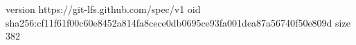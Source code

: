 version https://git-lfs.github.com/spec/v1
oid sha256:cf11f61f00c60e8452a814fa8cece0db0695ce93fa001dea87a56740f50e809d
size 382
